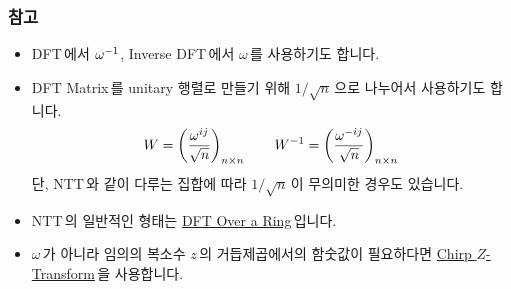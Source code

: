 \begin{frame}
    \frametitle{참고}
    \begin{itemize}
        \item DFT\,에서 \(\omega^{-1}\), Inverse DFT\,에서 \(\omega\)\,를 사용하기도 합니다.
        \item DFT Matrix\,를 unitary 행렬로 만들기 위해 \(1/\sqrt{n}\)\,으로 나누어서 사용하기도 합니다.
        \[
            W = \left(\frac{\omega^{ij}}{\sqrt{n}}\right)_{n \times n} \qquad W^{-1} = \left(\frac{\omega^{-ij}}{\sqrt{n}}\right)_{n \times n}
        \]
        단, NTT\,와 같이 다루는 집합에 따라 \(1/\sqrt{n}\)\,이 무의미한 경우도 있습니다.
        \item NTT\,의 일반적인 형태는 \href{https://en.wikipedia.org/wiki/Discrete_Fourier_transform_over_a_ring}{DFT Over a Ring}\,입니다.
        \item \(\omega\)\,가 아니라 임의의 복소수 \(z\)\,의 거듭제곱에서의 함숫값이 필요하다면 \href{https://en.wikipedia.org/wiki/Chirp_Z-transform}{Chirp \(Z\)-Transform}\,을 사용합니다.
    \end{itemize}
\end{frame}
